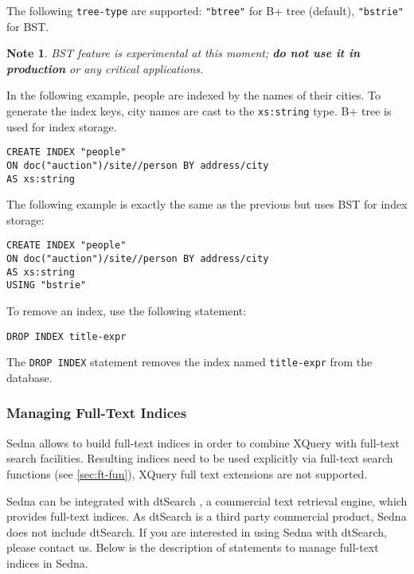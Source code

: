 \documentclass[a4paper,12pt]{article}
\newtheorem{note}{Note}    %
\begin{document}
The following \verb!tree-type! are supported: \verb!"btree"! for B+ tree
(default), \verb!"bstrie"! for BST.

\begin{note} BST feature is experimental at this moment; \textbf{do not use it
in production} or any critical applications.
\end{note}

In the following example, people are indexed by the names of their cities. To
generate the index keys, city names are cast to the \verb!xs:string! type. B+
tree is used for index storage.

\begin{verbatim}
CREATE INDEX "people"
ON doc("auction")/site//person BY address/city
AS xs:string
\end{verbatim}

The following example is exactly the same as the previous but uses BST for index
storage:

\begin{verbatim}
CREATE INDEX "people"
ON doc("auction")/site//person BY address/city
AS xs:string
USING "bstrie"
\end{verbatim}


To remove an index, use the following statement:
\begin{verbatim}
DROP INDEX title-expr
\end{verbatim}

The \verb!DROP INDEX! statement removes the index named \verb!title-expr! from
the database.


\subsubsection{Managing Full-Text Indices}
\label{sec:managing-ft-indices}
Sedna allows to build full-text indices in order to combine XQuery with
full-text search facilities. Resulting indices need to be used explicitly via
full-text search functions (see \ref{sec:ft-fun}), XQuery full text extensions
are not supported.

Sedna can be integrated with dtSearch \cite{link:dtsearch-engine}, a commercial
text retrieval engine, which provides full-text indices. As dtSearch is a third
party commercial product, Sedna does not include dtSearch. If you are interested
in using Sedna with dtSearch, please contact us. Below is the description of
statements to manage full-text indices in Sedna.
\end{document}
